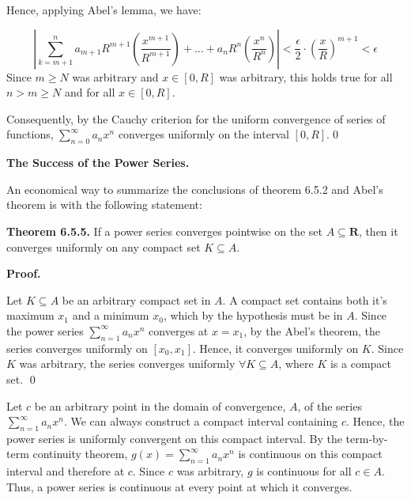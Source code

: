 \documentclass[10pt]{article}
\begin{document}
Hence, applying Abel's lemma, we have:




\begin{equation*}
\left| \sum _{k=m+1}^{n} a_{m+1} R^{m+1}\left(\frac{x^{m+1}}{R^{m+1}}\right) +\dotsc +a_{n} R^{n}\left(\frac{x^{n}}{R^{n}}\right)\right| < \frac{\epsilon }{2} \cdot \left(\frac{x}{R}\right)^{m+1} < \epsilon 
\end{equation*}
Since $\displaystyle m\geq N$ was arbitrary and $\displaystyle x\in [ 0,R]$ was arbitrary, this holds true for all $\displaystyle n >m\geq N$ and for all $\displaystyle x\in [ 0,R]$. 



Consequently, by the Cauchy criterion for the uniform convergence of series of functions, $\displaystyle \sum _{n=0}^{\infty } a_{n} x^{n}$ converges uniformly on the interval $\displaystyle [ 0,R]$.\qed 



\textbf{The Success of the Power Series.}



An economical way to summarize the conclusions of theorem 6.5.2 and Abel's theorem is with the following statement:



\textbf{Theorem 6.5.5. }If a power series converges pointwise on the set $\displaystyle A\subseteq \mathbf{R}$, then it converges uniformly on any compact set $\displaystyle K\subseteq A$.



\textbf{Proof.}



Let $\displaystyle K\subseteq A$ be an arbitrary compact set in $\displaystyle A$. A compact set contains both it's maximum $\displaystyle x_{1}$ and a minimum $\displaystyle x_{0}$, which by the hypothesis must be in $\displaystyle A$. Since the power series $\displaystyle \sum _{n=1}^{\infty } a_{n} x^{n}$ converges at $\displaystyle x=x_{1}$, by the Abel's theorem, the series converges uniformly on $\displaystyle [ x_{0} ,x_{1}]$. Hence, it converges uniformly on $\displaystyle K$. Since $\displaystyle K$ was arbitrary, the series converges uniformly $\displaystyle \forall K\subseteq A$, where $\displaystyle K$ is a compact set. \qed 



Let $\displaystyle c$ be an arbitrary point in the domain of convergence, $\displaystyle A$, of the series $\displaystyle \sum _{n=1}^{\infty } a_{n} x^{n}$. We can always construct a compact interval containing $\displaystyle c$. Hence, the power series is uniformly convergent on this compact interval. By the term-by-term continuity theorem, $\displaystyle g( x) =\sum _{n=1}^{\infty } a_{n} x^{n}$ is continuous on this compact interval and therefore at $\displaystyle c$. Since $\displaystyle c$ was arbitrary, $\displaystyle g$ is continuous for all $\displaystyle c\in A$. Thus, a power series is continuous at every point at which it converges.
\end{document}
